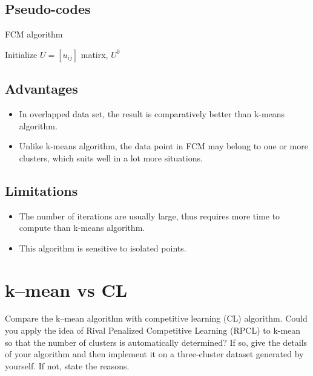 \documentclass{article}
\theoremstyle{definition}
\numberwithin{equation}{section}
\numberwithin{figure}{section}
\begin{document}
\subsection{Pseudo-codes}
\begin{algorithm}[H]
		\BlankLine
		\caption{FCM algorithm}\label{FCM}
		\BlankLine
        Initialize $U=[u_{ij}]$ matirx, $U^{0}$ \\
        
        
	\end{algorithm}

\subsection{Advantages}
\begin{itemize}
\item In overlapped data set, the result is comparatively better than k-means algorithm.
\item Unlike k-means algorithm, the data point in FCM may belong to one or more clusters, which suits well in a lot more situations. 
\end{itemize}
\subsection{Limitations}
\begin{itemize}
\item The number of iterations are usually large, thus requires more time to compute than k-means algorithm. 
\item This algorithm is sensitive to isolated points.
\end{itemize}

\section{k--mean vs CL}
Compare the k--mean algorithm with competitive learning (CL) algorithm. Could you apply the
idea of Rival Penalized Competitive Learning (RPCL) to k-mean so that the number of clusters
is automatically determined? If so, give the details of your algorithm and then implement it on a
three-cluster dataset generated by yourself. If not, state the reasons.
\end{document}
